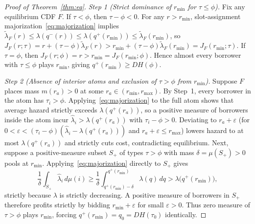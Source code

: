 \begin{proof}[Proof of Theorem~\ref{thm:eq}]
\emph{Step 1 (Strict dominance of $r_{\min}$ for $\tau \le \phi$).} Fix any equilibrium CDF $F$. If $\tau < \phi$, then $\tau - \phi < 0$. For any $r > r_{\min}$, slot-assignment majorization~\eqref{eq:majorization} implies $\tilde{\lambda}_F(r) \le \lambda(q^-(r)) \le \lambda(q^+(r_{\min})) \le \tilde{\lambda}_F(r_{\min})$, so $J_F(r; \tau) = r + (\tau - \phi)\tilde{\lambda}_F(r) > r_{\min} + (\tau - \phi)\tilde{\lambda}_F(r_{\min}) = J_F(r_{\min}; \tau)$. If $\tau = \phi$, then $J_F(r; \phi) = r > r_{\min} = J_F(r_{\min}; \phi)$. Hence almost every borrower with $\tau \le \phi$ plays $r_{\min}$, giving $q^+(r_{\min}) \ge D H(\phi)$.

\emph{Step 2 (Absence of interior atoms and exclusion of $\tau > \phi$ from $r_{\min}$).} Suppose $F$ places mass $m(r_a) > 0$ at some $r_a \in (r_{\min}, r_{\max})$. By Step~1, every borrower in the atom has $\tau_i > \phi$. Applying~\eqref{eq:majorization} to the full atom shows that average hazard strictly exceeds $\lambda(q^+(r_a))$, so a positive measure of borrowers inside the atom incur $\hat{\lambda}_i > \lambda(q^+(r_a))$ with $\tau_i - \phi > 0$. Deviating to $r_a + \varepsilon$ (for $0 < \varepsilon < (\tau_i - \phi)(\hat{\lambda}_i - \lambda(q^+(r_a)))$ and $r_a + \varepsilon \le r_{\max}$) lowers hazard to at most $\lambda(q^+(r_a))$ and strictly cuts cost, contradicting equilibrium. Next, suppose a positive-measure subset $S_+$ of types $\tau > \phi$ with mass $\delta = \mu(S_+) > 0$ pools at $r_{\min}$. Applying~\eqref{eq:majorization} directly to $S_+$ gives
\[
\frac{1}{\delta}\int_{S_+} \hat{\lambda}_i\,d\mu(i) \ge \frac{1}{\delta}\int_{q^+(r_{\min}) - \delta}^{q^+(r_{\min})} \lambda(q)\,dq > \lambda\bigl(q^+(r_{\min})\bigr),
\]
strictly because $\lambda$ is strictly decreasing. A positive measure of borrowers in $S_+$ therefore profits strictly by bidding $r_{\min} + \varepsilon$ for small $\varepsilon > 0$. Thus zero measure of $\tau > \phi$ plays $r_{\min}$, forcing $q^+(r_{\min}) = q_0 = D H(\tau_0)$ identically.


\end{proof}
